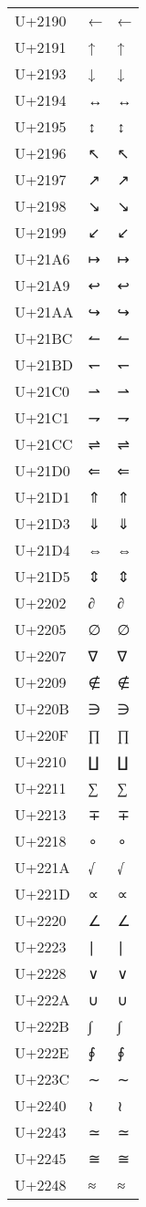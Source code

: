 \documentclass{article}
\begin{document}
\begin{longtable}{lll}
U+2190 & ← & ← \\
U+2191 & ↑ & ↑ \\
U+2193 & ↓ & ↓ \\
U+2194 & ↔ & ↔ \\
U+2195 & ↕ & ↕ \\
U+2196 & ↖ & ↖ \\
U+2197 & ↗ & ↗ \\
U+2198 & ↘ & ↘ \\
U+2199 & ↙ & ↙ \\
U+21A6 & ↦ & ↦ \\
U+21A9 & ↩ & ↩ \\
U+21AA & ↪ & ↪ \\
U+21BC & ↼ & ↼ \\
U+21BD & ↽ & ↽ \\
U+21C0 & ⇀ & ⇀ \\
U+21C1 & ⇁ & ⇁ \\
U+21CC & ⇌ & ⇌ \\
U+21D0 & ⇐ & ⇐ \\
U+21D1 & ⇑ & ⇑ \\
U+21D3 & ⇓ & ⇓ \\
U+21D4 & ⇔ & ⇔ \\
U+21D5 & ⇕ & ⇕ \\
U+2202 & ∂ & ∂ \\
U+2205 & ∅ & ∅ \\
U+2207 & ∇ & ∇ \\
U+2209 & ∉ & ∉ \\
U+220B & ∋ & ∋ \\
U+220F & ∏ & ∏ \\
U+2210 & ∐ & ∐ \\
U+2211 & ∑ & ∑ \\
U+2213 & ∓ & ∓ \\
U+2218 & ∘ & ∘ \\
U+221A & √ & √ \\
U+221D & ∝ & ∝ \\
U+2220 & ∠ & ∠ \\
U+2223 & ∣ & ∣ \\
U+2228 & ∨ & ∨ \\
U+222A & ∪ & ∪ \\
U+222B & ∫ & ∫ \\
U+222E & ∮ & ∮ \\
U+223C & ∼ & ∼ \\
U+2240 & ≀ & ≀ \\
U+2243 & ≃ & ≃ \\
U+2245 & ≅ & ≅ \\
U+2248 & ≈ & ≈ \\

\end{longtable}
\end{document}
